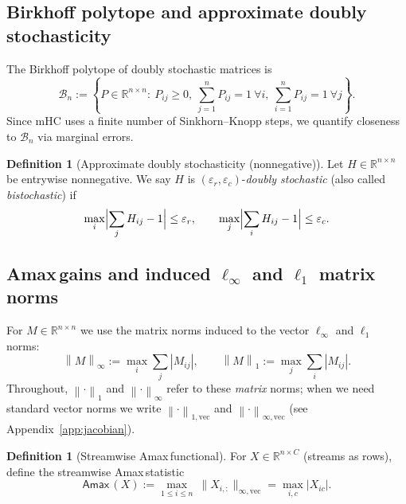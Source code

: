 \documentclass[11pt]{article}
\numberwithin{equation}{section}
\theoremstyle{plain}
\theoremstyle{definition}
\newtheorem{definition}[theorem]{Definition}
\theoremstyle{remark}
\newcommand{\R}{\mathbb{R}}
\newcommand{\cB}{\mathcal{B}}
\newcommand{\norm}[1]{\left\lVert #1 \right\rVert}
\newcommand{\Amax}{\textsf{Amax}\,}
\begin{document}
\subsection{Birkhoff polytope and approximate doubly stochasticity}
The Birkhoff polytope of doubly stochastic matrices is
\begin{equation}\label{eq:birkhoff}
\cB_n
:=
\left\{P\in\R^{n\times n}:\ P_{ij}\ge 0,\ 
\sum_{j=1}^n P_{ij}=1\ \forall i,\ 
\sum_{i=1}^n P_{ij}=1\ \forall j
\right\}.
\end{equation}
Since mHC uses a finite number of Sinkhorn--Knopp steps, we quantify closeness to $\cB_n$ via marginal errors.

\begin{definition}[Approximate doubly stochasticity (nonnegative)]\label{def:approx}
Let $H\in\R^{n\times n}$ be entrywise nonnegative. We say $H$ is
$(\varepsilon_r,\varepsilon_c)$-\emph{doubly stochastic} (also called \emph{bistochastic}) if
\begin{equation}\label{eq:approx}
\max_{i}\Bigl|\sum_{j} H_{ij}-1\Bigr|\le \varepsilon_r,
\qquad
\max_{j}\Bigl|\sum_{i} H_{ij}-1\Bigr|\le \varepsilon_c.
\end{equation}
\end{definition}

\subsection{\Amax gains and induced \texorpdfstring{$\ell_\infty$ and $\ell_1$}{l-infty and l-1} matrix norms}
For $M\in\R^{n\times n}$ we use the matrix norms induced to the vector $\ell_\infty$ and $\ell_1$ norms:
\begin{equation}\label{eq:induced_norms}
\norm{M}_\infty := \max_{i}\sum_{j}|M_{ij}|,
\qquad
\norm{M}_1 := \max_{j}\sum_{i}|M_{ij}|.
\end{equation}
Throughout, $\norm{\cdot}_1$ and $\norm{\cdot}_\infty$ refer to these \emph{matrix} norms; when we need standard vector norms we write
$\norm{\cdot}_{1,\mathrm{vec}}$ and $\norm{\cdot}_{\infty,\mathrm{vec}}$ (see Appendix~\ref{app:jacobian}).

\begin{definition}[Streamwise \Amax functional]\label{def:amax-func}
For $X\in\R^{n\times C}$ (streams as rows), define the streamwise \Amax statistic
\begin{equation}
\Amax(X):=\max_{1\le i\le n}\ \|X_{i,:}\|_{\infty,\mathrm{vec}}
=\max_{i,c}|X_{ic}|.
\end{equation}
\end{definition}
\end{document}
